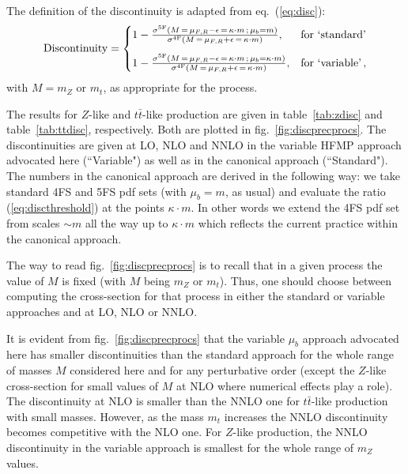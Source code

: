 \documentclass[letter,11pt]{article}
\def\t{{\bar t}}
\def\mub{\mu_b}
\def\k{\kappa}
\begin{document}
The definition of the discontinuity is adapted from eq.~(\ref{eq:disc}):
%
\begin{equation}
\label{eq:discthreshold}
{\rm Discontinuity} =
\begin{cases}
 1- {\sigma^{\rm 5F}(M \,=\, \mu_{F,R}-\epsilon \,=\, \kappa \cdot m \,;\,\mub= m) \over \sigma^{\rm 4F}(M\,=\,\mu_{F,R}+\epsilon\,=\,\kappa \cdot m)}, & \text{for `standard'} \\[10pt]
 1- {\sigma^{\rm 5F}(M \,=\, \mu_{F,R}-\epsilon \,=\, \kappa \cdot m \,;\,\mub=\kappa \cdot m) \over \sigma^{\rm 4F}(M\,=\,\mu_{F,R}+\epsilon\,=\,\kappa \cdot m)}, & \text{for `variable'}\,, \\
\end{cases}
\end{equation}
%
with $M=m_Z$ or $m_t$, as appropriate for the process.

The results for $Z$-like and $t\t$-like production are given in table~\ref{tab:zdisc} and table~\ref{tab:ttdisc}, respectively. Both are plotted in fig.~\ref{fig:discprecprocs}. The discontinuities are given at LO, NLO and NNLO in the variable HFMP approach advocated here (``Variable") as well as in the canonical approach (``Standard"). The numbers in the canonical approach are derived in the following way: we take standard 4FS and 5FS pdf sets (with $\mub=m$, as usual) and evaluate the ratio (\ref{eq:discthreshold}) at the points $\k\cdot m$. In other words we extend the 4FS pdf set from scales $\sim m$ all the way up to $\k\cdot m$ which reflects the current practice within the canonical approach. 

The way to read fig.~\ref{fig:discprecprocs} is to recall that in a given process the value of $M$ is fixed (with $M$ being $m_Z$ or $m_t$). Thus, one should choose between computing the cross-section for that process in either the standard or variable approaches and at LO, NLO or NNLO. 

It is evident from fig.~\ref{fig:discprecprocs} that the variable $\mub$ approach advocated here has smaller discontinuities than the standard approach for the whole range of masses $M$ considered here and for any perturbative order (except the $Z$-like cross-section for small values of $M$ at NLO where numerical effects play a role). The discontinuity at NLO is smaller than the NNLO one for $t\t$-like production with small masses. However, as the mass $m_t$ increases the NNLO discontinuity becomes competitive with the NLO one. For $Z$-like production, the NNLO discontinuity in the variable approach is smallest for the whole range of $m_Z$ values. 
\end{document}
